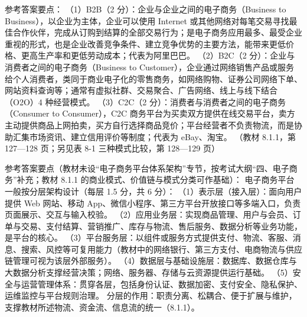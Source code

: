 \documentclass[a4paper,11pt]{article}
\begin{document}
\q 参考答案要点：
（1）B2B（2 分）：企业与企业之间的电子商务（Business to Business），以企业为主体，企业可以使用 Internet 或其他网络对每笔交易寻找最佳合作伙伴，完成从订购到结算的全部交易行为；是电子商务应用最多、最受企业重视的形式，也是企业改善竞争条件、建立竞争优势的主要方法，能带来更低价格、更高生产率和更低劳动成本；代表为阿里巴巴。
（2）B2C（2 分）：企业与消费者之间的电子商务（Business to Customer），企业通过网络销售产品或服务给个人消费者，类同于商业电子化的零售商务，如网络购物、证券公司网络下单、网站资料查询等；通常有虚拟社群、交易聚合、广告网络、线上与线下结合（O2O）4 种经营模式。
（3）C2C（2 分）：消费者与消费者之间的电子商务（Consumer to Consumer），C2C 商务平台为买卖双方提供在线交易平台，卖方主动提供商品上网拍卖，买方自行选择商品竞价；平台经营者不负责物流，而是协助汇集市场资讯、建立信用评价等制度；代表为 eBay、淘宝。
（教材 8.1.1，第 127—128 页；另见表 8-1 三种模式比较，第 128—129 页）

\q 参考答案要点（教材未设“电子商务平台体系架构”专节，按考试大纲“四、电子商务”补充；教材 8.1.1 的商业模式、价值链与模式分类可作基础）：
电子商务平台一般按分层架构设计（每层 1.5 分，共 6 分）：
（1）表示层（接入层）：面向用户提供 Web 网站、移动 App、微信小程序、第三方平台开放接口等多端入口，负责页面展示、交互与输入校验。
（2）应用业务层：实现商品管理、用户与会员、订单与交易、支付结算、营销推广、库存与物流、售后服务、数据分析等业务功能，是平台的核心。
（3）平台服务层：以组件或服务方式提供支付、物流、客服、消息、搜索、风控等可复用能力（教材中的网络银行、第三方支付、电商物流与供应链管理可视为该层外部服务）。
（4）数据层与基础设施层：数据库、数据仓库与大数据分析支撑经营决策；网络、服务器、存储与云资源提供运行基础。
（5）安全与运营管理体系：贯穿各层，包括身份认证、数据加密、支付安全、隐私保护、运维监控与平台规则治理。
分层的作用：职责分离、松耦合、便于扩展与维护，支撑教材所述物流、资金流、信息流的统一（8.1.1）。

\end{document}
